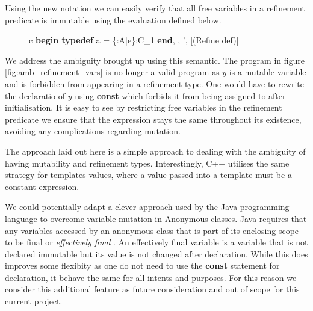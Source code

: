 \documentclass[a4paper,12pt]{report}
\begin{document}
\par
Using the new notation we can easily verify that all free variables in a 
refinement predicate is immutable using the evaluation defined below.
\begin{figure}[H]
  \begin{center}
    \begin{tabular}{c}
      {\langle \textbf{begin typedef } a = \{\upsilon :A\text{ }|\text{ }e\};C_1\textbf{ end}, 
      \sigma, \tau \rangle \longrightarrow 
        \langle \sigma', \tau \rangle}[(Refine def)]
    \end{tabular}
  \end{center}
\end{figure}

\par
We address the ambiguity brought up using this semantic. The program in figure 
\ref{fig:amb_refinement_vars} is no longer a valid program as 
$y$ is a mutable variable and is forbidden from appearing in a refinement type. 
One would have to rewrite the declaratio of $y$ using \textbf{const} which 
forbids it from being assigned to after initialisation. 
It is easy to see by restricting free variables in the refinement predicate we ensure 
that the expression stays the same throughout its existence, avoiding any 
complications regarding mutation.

\par
The approach laid out here is a simple approach to dealing with the ambiguity of 
having mutability and refinement types. Interestingly, C++ utilises the same 
strategy for templates values, where a value passed into a template must be a 
constant expression. 

\par
We could potentially adapt a clever approach used by the Java programming 
language to overcome variable mutation in Anonymous classes. Java requires that 
any variables accessed by an anonymous class that is part of 
its enclosing scope to be final or \textit{effectively final} 
\cite{effectFinal}. An effectively final variable is a variable that is not 
declared immutable but its value is not changed after declaration. While this 
does improves some flexibity as one do not need to use the \textbf{const} 
statement for declaration, it behave the same for all intents and purposes. 
For this reason we consider this additional feature as future consideration and 
out of scope for this current project. 
\end{document}
